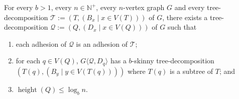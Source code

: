 \documentclass[twoside,leqno]{article}
\newcommand{\N}{\mathbb{N}}
\renewcommand{\le}{\leqslant}
\newcommand{\torso}[2]{{#1}\langle{#2}\rangle}
\DeclareMathOperator{\height}{height}
\begin{document}
\begin{cor}\label{b_skinny_decomp}
  For every $b>1$, every $n\in\N^+$, every $n$-vertex graph $G$ and every tree-decomposition $\mathcal{T}:=(T,(B_x\mid x\in V(T)))$ of $G$, there exists a tree-decomposition $\mathcal{Q}:=(Q,(D_x\mid x\in V(Q)))$ of $G$ such that
  \begin{enumerate}[nosep,nolistsep,label=\rm(\alph*)]
    \item\label{prop_adhesion}
          each adhesion of $\mathcal{Q}$ is an adhesion of $\mathcal{T}$;
    \item\label{prop_skinny_torso} for each $q\in V(Q)$, $\torso{G}{\mathcal{Q},D_q}$ has a $b$-skinny tree-decomposition $(T(q), (B_y\mid y\in V(T(q))))$ where $T(q)$ is a subtree of $T$; and
    \item\label{prop_geometric} $\height(Q)\le \log_b n$.
  \end{enumerate}
\end{cor}
\end{document}
